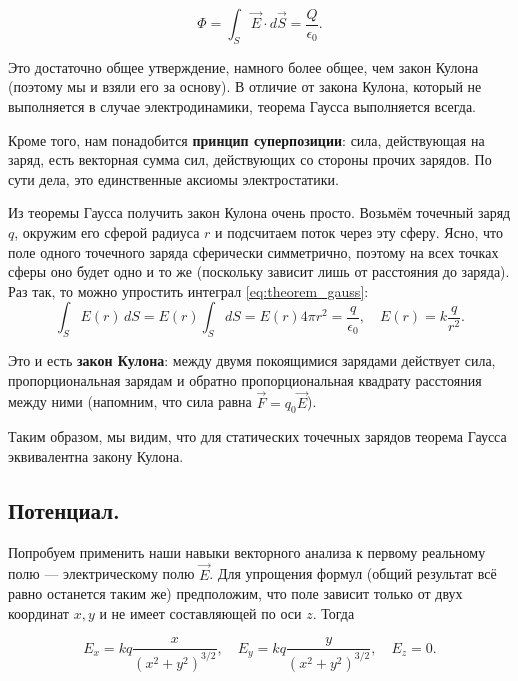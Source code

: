\documentclass[11pt,a4paper]{article}
\numberwithin{equation}{section}
\newcommand{\eps}{\epsilon}
\begin{document}
\begin{equation}
  \label{eq:theorem_gauss}
  \Phi = \int_S \vec{E} \cdot d\vec{S} = \frac{Q}{\epsilon_0}.
\end{equation}

Это достаточно общее утверждение, намного более общее, чем закон
Кулона (поэтому мы и взяли его за основу). В отличие от закона Кулона,
который не выполняется в случае электродинамики, теорема Гаусса
выполняется всегда. 

Кроме того, нам понадобится \textbf{принцип суперпозиции}: сила,
действующая на заряд, есть векторная сумма сил, действующих со стороны
прочих зарядов. По сути дела, это единственные аксиомы электростатики.

Из теоремы Гаусса получить закон Кулона очень просто. Возьмём точечный
заряд $q$, окружим его сферой радиуса $r$ и подсчитаем поток через эту
сферу. Ясно, что поле одного точечного заряда сферически симметрично,
поэтому на всех точках сферы оно будет одно и то же (поскольку зависит
лишь от расстояния до заряда). Раз так, то можно упростить интеграл
\eqref{eq:theorem_gauss}: 
\begin{equation}
  \label{eq:law_coulomb}
  \int_S E(r)\, dS = E(r) \int_S dS = E(r) 4\pi r^2 =
  \frac{q}{\eps_0}, \quad E(r) = k\frac{q}{r^2}.
\end{equation}

Это и есть \textbf{закон Кулона}: между двумя покоящимися зарядами
действует сила, пропорциональная зарядам и обратно пропорциональная
квадрату расстояния между ними (напомним, что сила равна $\vec{F} = q_0
\vec{E}$).

Таким образом, мы видим, что для статических точечных зарядов теорема
Гаусса эквивалентна закону Кулона. 

\subsection{Потенциал.}
\label{sec:potential}

Попробуем применить наши навыки векторного анализа к первому реальному
полю --- электрическому полю $\vec{E}$. Для упрощения формул (общий
результат всё равно останется таким же) предположим, что поле зависит
только от двух координат $x,y$ и не имеет составляющей по оси
$z$. Тогда

\begin{equation}
  \label{eq:rot_electrostatics_1}
  E_x = kq \frac{x}{(x^2+y^2)^{3/2}}, \quad   E_y = kq
  \frac{y}{(x^2+y^2)^{3/2}}, \quad E_z =0. 
\end{equation}
\end{document}
